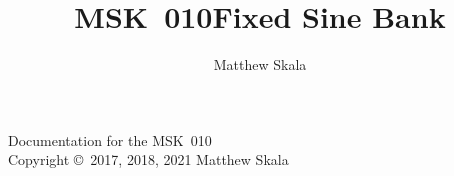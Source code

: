 \documentclass{ncmanual}
\title{MSK~010\quad Fixed Sine Bank}
\author{Matthew Skala}
\begin{document}
\maketitle


\begin{copyrightpage}
Documentation for the MSK~010\\
Copyright \copyright\ 2017, 2018, 2021 Matthew Skala

\GPLThreeStatement
\end{copyrightpage}

\tableofcontents














\end{document}
